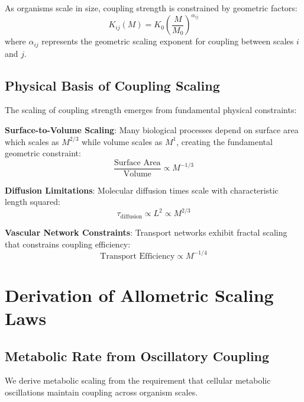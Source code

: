 \documentclass[twocolumn]{article}
\begin{document}
\begin{definition}
As organisms scale in size, coupling strength is constrained by geometric factors:
\begin{equation}
K_{ij}(M) = K_0 \left(\frac{M}{M_0}\right)^{\alpha_{ij}}
\label{eq:coupling_scaling}
\end{equation}
where $\alpha_{ij}$ represents the geometric scaling exponent for coupling between scales $i$ and $j$.
\end{definition}

\subsection{Physical Basis of Coupling Scaling}

The scaling of coupling strength emerges from fundamental physical constraints:

\textbf{Surface-to-Volume Scaling}: Many biological processes depend on surface area which scales as $M^{2/3}$ while volume scales as $M^1$, creating the fundamental geometric constraint:
\begin{equation}
\frac{\text{Surface Area}}{\text{Volume}} \propto M^{-1/3}
\label{eq:surface_volume}
\end{equation}

\textbf{Diffusion Limitations}: Molecular diffusion times scale with characteristic length squared:
\begin{equation}
\tau_{\text{diffusion}} \propto L^2 \propto M^{2/3}
\label{eq:diffusion_scaling}
\end{equation}

\textbf{Vascular Network Constraints}: Transport networks exhibit fractal scaling that constrains coupling efficiency:
\begin{equation}
\text{Transport Efficiency} \propto M^{-1/4}
\label{eq:transport_scaling}
\end{equation}

\section{Derivation of Allometric Scaling Laws}

\subsection{Metabolic Rate from Oscillatory Coupling}

We derive metabolic scaling from the requirement that cellular metabolic oscillations maintain coupling across organism scales.
\end{document}
